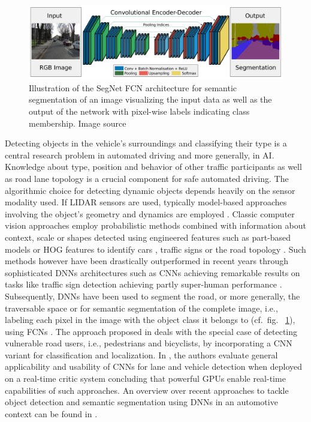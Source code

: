 \begin{figure}[t!]
    \centering
    \includegraphics[width=0.95\linewidth]{imgs/segnet.png}
    \caption{Illustration of the SegNet \ac{FCN} architecture for semantic segmentation of an image visualizing the input data as well as the output of the network with pixel-wise labels indicating class membership. Image source \cite{Badrinarayanan2015}}
    \label{fig:segnet_achitecture}
\end{figure}
Detecting objects in the vehicle's surroundings and classifying their type is a central research problem in automated driving and more generally, in \ac{AI}.
Knowledge about type, position and behavior of other traffic participants as well as road lane topology is a crucial component for safe automated driving.
The algorithmic choice for detecting dynamic objects depends heavily on the sensor modality used.
If \ac{LIDAR} sensors are used, typically model-based approaches involving the object's geometry and dynamics are employed \cite{Petrovskaya2009a, Petrovskaya2009, Darms2008}.
Classic computer vision approaches employ probabilistic methods combined with information about context, scale or shapes detected using engineered features such as part-based models or \ac{HOG} features to identify cars \cite{Held2012}, traffic signs \cite{Li2015} or the road topology \cite{Alvarez2011, Beyeler2014}.
Such methods however have been drastically outperformed in recent years through sophisticated \acp{DNN} architectures such as \acp{CNN} achieving remarkable results on tasks like traffic sign detection \cite{Ciresan2012, Sermanet2011} achieving partly super-human performance \cite{Stallkamp2012}.
Subsequently, \acp{DNN} have been used to segment the road, or more generally, the traversable space \cite{Mohan2014, Bittel2015} or for semantic segmentation of the complete image, i.e., labeling each pixel in the image with the object class it belongs to (cf.\ fig. ~\ref{fig:segnet_achitecture}), using \acp{FCN} \cite{Badrinarayanan2015, Long2015, Chen2018}.
The approach proposed in \cite{Li2017} deals with the special case of detecting vulnerable road users, i.e., pedestrians and bicyclists, by incorporating a \ac{CNN} variant for classification and localization.
In \cite{Huval2015}, the authors evaluate general applicability and usability of \acp{CNN} for lane and vehicle detection when deployed on a real-time critic system concluding that powerful \acp{GPU} enable real-time capabilities of such approaches.
An overview over recent approaches to tackle object detection and semantic segmentation using \acp{DNN} in an automotive context can be found in \cite{Feng2019}.

